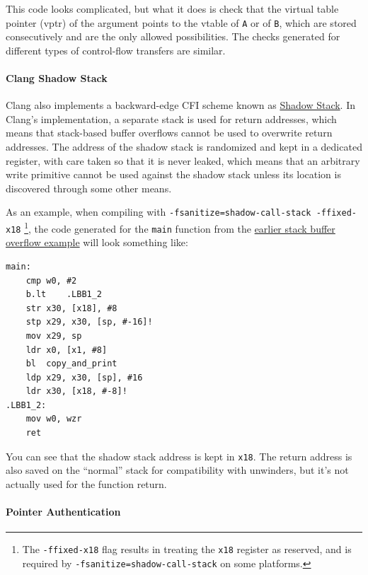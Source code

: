 \documentclass[
  a4paper,
]{report}
\begin{document}
This code looks complicated, but what it does is check that the virtual
table pointer (vptr) of the argument points to the vtable of \texttt{A}
or of \texttt{B}, which are stored consecutively and are the only
allowed possibilities. The checks generated for different types of
control-flow transfers are similar.

\paragraph{Clang Shadow Stack}\label{sec:clang-shadow-stack}

Clang also implements a backward-edge CFI scheme known as
\href{https://clang.llvm.org/docs/ShadowCallStack.html}{\label{__index_entry_50}{Shadow
Stack}}. In Clang's implementation, a separate stack
is used for return addresses, which means that stack-based buffer
overflows cannot be used to overwrite return addresses. The address of
the shadow stack is randomized and kept in a dedicated register, with
care taken so that it is never leaked, which means that an arbitrary
write primitive cannot be used against the shadow stack unless its
location is discovered through some other means.

As an example, when compiling with
\texttt{-fsanitize=shadow-call-stack\ -ffixed-x18} \footnote{The
  \texttt{-ffixed-x18} flag results in treating the \texttt{x18}
  register as reserved, and is required by
  \texttt{-fsanitize=shadow-call-stack} on some platforms.}, the code
generated for the \texttt{main} function from the
\hyperref[stack-buffer-overflow]{earlier stack buffer overflow example}
will look something like:

\begin{verbatim}
main:
    cmp w0, #2
    b.lt    .LBB1_2
    str x30, [x18], #8
    stp x29, x30, [sp, #-16]!
    mov x29, sp
    ldr x0, [x1, #8]
    bl  copy_and_print
    ldp x29, x30, [sp], #16
    ldr x30, [x18, #-8]!
.LBB1_2:
    mov w0, wzr
    ret
\end{verbatim}

You can see that the shadow stack address is kept in \texttt{x18}. The
return address is also saved on the ``normal'' stack for compatibility
with unwinders, but it's not actually used for the function return.

\paragraph{Pointer Authentication}\label{sec:pointer-authentication}
\end{document}
